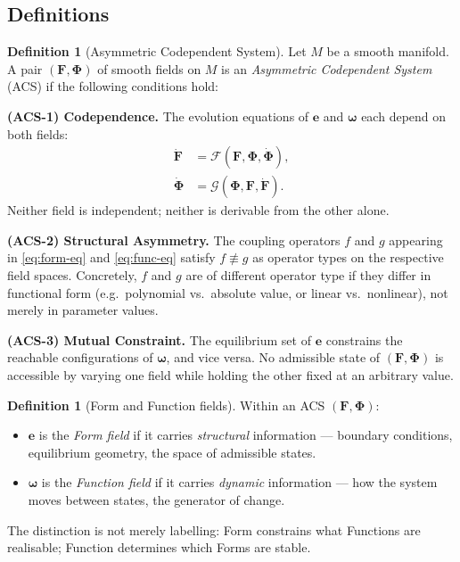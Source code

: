 \documentclass[11pt,a4paper]{article}
\theoremstyle{plain}
\theoremstyle{definition}
\newtheorem{definition}[theorem]{Definition}
\theoremstyle{remark}
\newcommand{\FormF}{\mathbf{F}}
\newcommand{\FuncF}{\boldsymbol{\Phi}}
\providecommand{\Form}{\mathbf{e}}
\providecommand{\Func}{\boldsymbol{\omega}}
\begin{document}
\subsection{Definitions}

\begin{definition}[Asymmetric Codependent System]\label{def:acs}
Let $M$ be a smooth manifold.  A pair $(\FormF, \FuncF)$ of smooth fields on 
$M$ is an \emph{Asymmetric Codependent System} (ACS) if the following 
conditions hold:

\medskip
\noindent\textbf{(ACS-1) Codependence.}
The evolution equations of $\Form$ and $\Func$ each depend on both fields:
\begin{align}
\dot{\FormF} &= \mathcal{F}(\FormF, \FuncF, \dot{\FuncF}), \label{eq:form-eq}\\
\dot{\FuncF} &= \mathcal{G}(\FuncF, \FormF, \dot{\FormF}). \label{eq:func-eq}
\end{align}
Neither field is independent; neither is derivable from the other alone.

\medskip
\noindent\textbf{(ACS-2) Structural Asymmetry.}
The coupling operators $f$ and $g$ appearing in \eqref{eq:form-eq} and 
\eqref{eq:func-eq} satisfy $f \not\equiv g$ as operator types on the 
respective field spaces.  Concretely, $f$ and $g$ are of different
operator type if they differ in functional form (e.g.\ polynomial vs.\
absolute value, or linear vs.\ nonlinear), not merely in parameter values.

\medskip
\noindent\textbf{(ACS-3) Mutual Constraint.}
The equilibrium set of $\Form$ constrains the reachable configurations of 
$\Func$, and vice versa.  No admissible state of $(\FormF, \FuncF)$ is 
accessible by varying one field while holding the other fixed at an 
arbitrary value.
\end{definition}

\begin{definition}[Form and Function fields]\label{def:FF}
Within an ACS $(\FormF, \FuncF)$:
\begin{itemize}[noitemsep]
  \item $\Form$ is the \emph{Form field} if it carries \emph{structural} 
    information --- boundary conditions, equilibrium geometry, the space of 
    admissible states.
  \item $\Func$ is the \emph{Function field} if it carries \emph{dynamic} 
    information --- how the system moves between states, the generator of 
    change.
\end{itemize}
The distinction is not merely labelling: Form constrains what Functions 
are realisable; Function determines which Forms are stable.
\end{definition}
\end{document}
